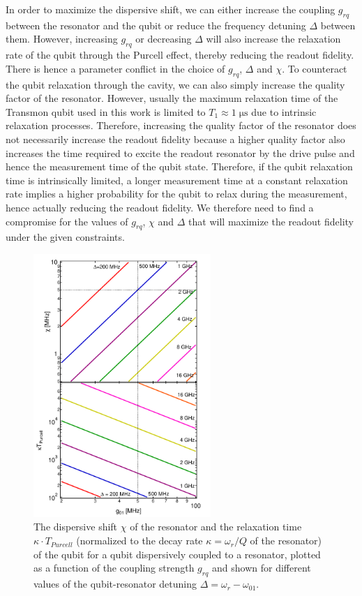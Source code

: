 In order to maximize the dispersive shift, we can either increase the coupling $g_{rq}$ between the resonator and the qubit or reduce the frequency detuning $\Delta$ between them. However, increasing $g_{rq}$ or decreasing $\Delta$ will also increase the relaxation rate of the qubit through the Purcell effect, thereby reducing the readout fidelity. There is hence a parameter conflict in the choice of $g_{rq}$, $\Delta$ and $\chi$. To counteract the qubit relaxation through the cavity, we can also simply increase the quality factor of the resonator. However, usually the maximum relaxation time of the Transmon qubit used in this work is limited to $T_1\approx 1\;\mathrm{\mu s}$ due to intrinsic relaxation processes. Therefore, increasing the quality factor of the resonator does not necessarily increase the readout fidelity because a higher quality factor also increases the time required to excite the readout resonator by the drive pulse and hence the measurement time of the qubit state. Therefore, if the qubit relaxation time is intrinsically limited, a longer measurement time at a constant relaxation rate implies a higher probability for the qubit to relax during the measurement, hence actually reducing the readout fidelity. We therefore need to find a compromise for the values of $g_{rq}$, $\chi$ and $\Delta$ that will maximize the readout fidelity under the given constraints.

\begin{figure}
	\includegraphics[width=0.6\textwidth]{./material/mathematica/readout_purcell_and_chi_vs_g}
	\caption[]{The dispersive shift $\chi$ of the resonator and the relaxation time $\kappa\cdot T_{Purcell}$ (normalized to the decay rate $\kappa=\omega_r/Q$ of the resonator) of the qubit for a qubit dispersively coupled to a resonator, plotted as a function of the coupling strength $g_{rq}$ and shown for different values of the qubit-resonator detuning $\Delta = \omega_{r}-\omega_{01}$.}
	\label{fig:purcell_rate_and_chi}
\end{figure}


